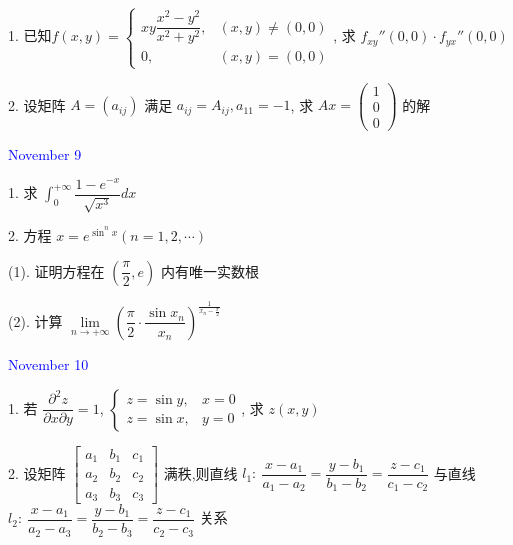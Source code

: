 1. 已知$f(x,y)=
\begin{cases}
	xy\dfrac{x^2-y^2}{x^2+y^2}, &(x,y)\neq(0,0)\\
	0, &(x,y)=(0,0)
\end{cases}$, 求 $f_{xy}''(0,0)\cdot f_{yx}''(0,0)$
\begin{solution}
	
\end{solution}

2. 设矩阵 $A=(a_{ij})$ 满足 $a_{ij}=A_{ij},a_{11}=-1$,
求 $Ax=
\begin{pmatrix}
	1 \\
	0 \\
	0
\end{pmatrix}$ 的解
\begin{solution}
	
\end{solution}

\textcolor{blue}{November 9}

1. 求 $\displaystyle{\int_{0}^{+\infty}\dfrac{1-e^{-x}}{\sqrt{x^3}}dx}$
\begin{solution}
	
\end{solution}

2. 方程 $\displaystyle{x=e^{\sin^{n}x}(n=1,2,\cdots)}$

(1). 证明方程在 $(\dfrac{\pi}{2},e)$ 内有唯一实数根

(2). 计算 $\displaystyle{\lim\limits_{n\to +\infty}\left(\dfrac{\pi}{2}\cdot \dfrac{\sin x_{n}}{x_{n}} \right)^{\frac{1}{x_{n}-\frac{\pi}{2}}}}$
\begin{solution}
	
\end{solution}

\textcolor{blue}{November 10}

1. 若 $\dfrac{\partial^2 z}{\partial x\partial y}=1$, 
$\begin{cases}
	z = \sin y, &x=0 \\
	z = \sin x, &y=0
\end{cases}$, 求 $z(x,y)$
\begin{solution}
	
\end{solution}

2. 设矩阵
$\begin{bmatrix}
	a_{1} & b_{1} & c_{1} \\
	a_{2} & b_{2} & c_{2} \\
	a_{3} & b_{3} & c_{3}
\end{bmatrix}$ 满秩,则直线
 $l_{1}:\ \dfrac{x-a_{1}}{a_{1}-a_{2}}=\dfrac{y-b_{1}}{b_{1}-b_{2}}=\dfrac{z-c_{1}}{c_{1}-c_{2}}$
 与直线 $l_{2}:\ \dfrac{x-a_{1}}{a_{2}-a_{3}}=\dfrac{y-b_{1}}{b_{2}-b_{3}}=\dfrac{z-c_{1}}{c_{2}-c_{3}}$ 关系
\begin{solution}
	
\end{solution}

